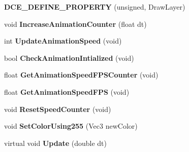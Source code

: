 \begin{DoxyCompactItemize}
\item 
\hypertarget{classDCEngine_1_1Components_1_1Sprite_ac29859db7596b4e360683a5fdf54ab39}{{\bfseries D\-C\-E\-\_\-\-D\-E\-F\-I\-N\-E\-\_\-\-P\-R\-O\-P\-E\-R\-T\-Y} (unsigned, Draw\-Layer)}\label{classDCEngine_1_1Components_1_1Sprite_ac29859db7596b4e360683a5fdf54ab39}

\item 
\hypertarget{classDCEngine_1_1Components_1_1Sprite_ad9e5be4a189b9c8833e33ecae828b1c9}{void {\bfseries Increase\-Animation\-Counter} (float dt)}\label{classDCEngine_1_1Components_1_1Sprite_ad9e5be4a189b9c8833e33ecae828b1c9}

\item 
\hypertarget{classDCEngine_1_1Components_1_1Sprite_a8fad287515995eee0093c2605d8cab97}{int {\bfseries Update\-Animation\-Speed} (void)}\label{classDCEngine_1_1Components_1_1Sprite_a8fad287515995eee0093c2605d8cab97}

\item 
\hypertarget{classDCEngine_1_1Components_1_1Sprite_a226ec4fb02198f1a298d179a00ad017b}{bool {\bfseries Check\-Animation\-Intialized} (void)}\label{classDCEngine_1_1Components_1_1Sprite_a226ec4fb02198f1a298d179a00ad017b}

\item 
\hypertarget{classDCEngine_1_1Components_1_1Sprite_a457bee124efd6795d151214bd6ed45b4}{float {\bfseries Get\-Animation\-Speed\-F\-P\-S\-Counter} (void)}\label{classDCEngine_1_1Components_1_1Sprite_a457bee124efd6795d151214bd6ed45b4}

\item 
\hypertarget{classDCEngine_1_1Components_1_1Sprite_a19b704731efeb54939867d3570cc31cf}{float {\bfseries Get\-Animation\-Speed\-F\-P\-S} (void)}\label{classDCEngine_1_1Components_1_1Sprite_a19b704731efeb54939867d3570cc31cf}

\item 
\hypertarget{classDCEngine_1_1Components_1_1Sprite_ac732f4adf4b5c6333cd48dfe34247c75}{void {\bfseries Reset\-Speed\-Counter} (void)}\label{classDCEngine_1_1Components_1_1Sprite_ac732f4adf4b5c6333cd48dfe34247c75}

\item 
\hypertarget{classDCEngine_1_1Components_1_1Sprite_a6892212fb56bdeff23d13645ebb46ae1}{void {\bfseries Set\-Color\-Using255} (Vec3 new\-Color)}\label{classDCEngine_1_1Components_1_1Sprite_a6892212fb56bdeff23d13645ebb46ae1}

\item 
\hypertarget{classDCEngine_1_1Components_1_1Sprite_a2ba19c52a8e8aff4e00511a2869bfb58}{virtual void {\bfseries Update} (double dt)}\label{classDCEngine_1_1Components_1_1Sprite_a2ba19c52a8e8aff4e00511a2869bfb58}


\end{DoxyCompactItemize}
